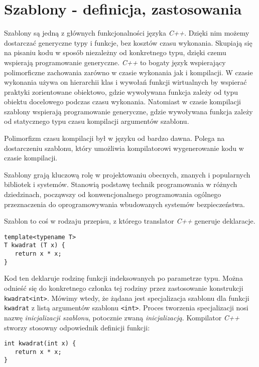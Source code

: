 \documentclass[11pt, a4paper]{article}
\begin{document}
\lstset{language=C++}

\section{Szablony - definicja, zastosowania}
Szablony są jedną z głównych funkcjonalności języka \emph{C++}. Dzięki nim możemy dostarczać generyczne typy i funkcje, bez kosztów czasu wykonania. Skupiają się na pisaniu kodu w sposób niezależny od konkretnego typu, dzięki czemu wspierają programowanie generyczne. \emph{C++} to bogaty język wspierający polimorficzne zachowania zarówno w czasie wykonania jak i kompilacji. W czasie wykonania używa on hierarchii klas i wywołań funkcji wirtualnych by wspierać praktyki zorientowane obiektowo, gdzie wywoływana funkcja zależy od typu obiektu docelowego podczas czasu wykonania. Natomiast w czasie kompilacji szablony wspierają programowanie generyczne, gdzie wywoływana funkcja zależy od statycznego typu czasu kompilacji argumentów szablonu.

Polimorfizm czasu kompilacji był w języku od bardzo dawna. Polega na dostarczeniu szablonu, który umożliwia kompilatorowi wygenerowanie kodu w czasie kompilacji.

Szablony grają kluczową rolę w projektowaniu obecnych, znanych i popularnych bibliotek i systemów. Stanowią podstawę technik programowania w różnych dziedzinach, począwszy od konwencjonalnego programowania ogólnego przeznaczenia do oprogramowywania wbudowanych systemów bezpieczeństwa.

Szablon to coś w rodzaju przepisu, z którego translator \emph{C++} generuje deklaracje.

\begin{lstlisting}[frame=single]
template<typename T>
T kwadrat (T x) {
   return x * x;
}
\end{lstlisting}

Kod ten deklaruje rodzinę funkcji indeksowanych po parametrze typu. Można odnieść się do konkretnego członka tej rodziny przez zastosowanie konstrukcji \verb#kwadrat<int>#. Mówimy wtedy, że żądana jest specjalizacja szablonu dla funkcji \verb#kwadrat# z listą argumentów szablonu \verb#<int>#. Proces tworzenia specjalizacji nosi nazwę \emph{inicjalizacji szablonu}, potocznie zwaną \emph{inicjalizacją}. Kompilator \emph{C++} stworzy stosowny odpowiednik definicji funkcji:

\begin{lstlisting}[frame=single]
int kwadrat(int x) {
   return x * x;
}
\end{lstlisting}
\end{document}
